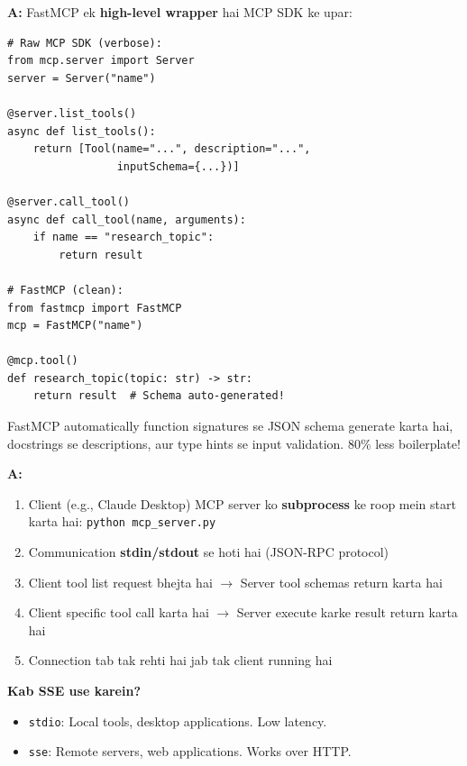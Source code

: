 \documentclass[12pt, a4paper]{article}
\begin{document}
\begin{interviewbox}[title={\faIcon{user-tie} ~Q32: FastMCP vs raw MCP SDK --- kyun FastMCP?}]
\textbf{A:} FastMCP ek \textbf{high-level wrapper} hai MCP SDK ke upar:
\begin{lstlisting}[style=pythonstyle]
# Raw MCP SDK (verbose):
from mcp.server import Server
server = Server("name")

@server.list_tools()
async def list_tools():
    return [Tool(name="...", description="...",
                 inputSchema={...})]

@server.call_tool()
async def call_tool(name, arguments):
    if name == "research_topic":
        return result

# FastMCP (clean):
from fastmcp import FastMCP
mcp = FastMCP("name")

@mcp.tool()
def research_topic(topic: str) -> str:
    return result  # Schema auto-generated!
\end{lstlisting}

FastMCP automatically function signatures se JSON schema generate karta hai, docstrings se descriptions, aur type hints se input validation. 80\% less boilerplate!
\end{interviewbox}

\begin{interviewbox}[title={\faIcon{user-tie} ~Q33: MCP mein stdio transport kaise kaam karta hai?}]
\textbf{A:}
\begin{enumerate}
\item Client (e.g., Claude Desktop) MCP server ko \textbf{subprocess} ke roop mein start karta hai: \texttt{python mcp\_server.py}
\item Communication \textbf{stdin/stdout} se hoti hai (JSON-RPC protocol)
\item Client tool list request bhejta hai $\rightarrow$ Server tool schemas return karta hai
\item Client specific tool call karta hai $\rightarrow$ Server execute karke result return karta hai
\item Connection tab tak rehti hai jab tak client running hai
\end{enumerate}

\textbf{Kab SSE use karein?}
\begin{itemize}
\item \texttt{stdio}: Local tools, desktop applications. Low latency.
\item \texttt{sse}: Remote servers, web applications. Works over HTTP.
\end{itemize}
\end{interviewbox}
\end{document}
